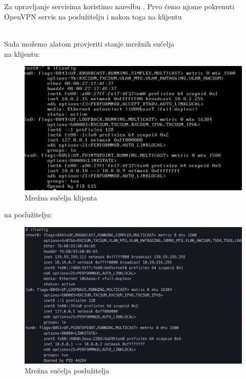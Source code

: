         \noindent
         \\
         \\
         \\
         \\

        Za upravljanje servisima koristimo naredbu . Prvo ćemo
        njome pokrenuti OpenVPN servis na poslužitelju i nakon toga na klijentu

        \noindent
         \\

        \noindent
        Sada možemo alatom  provjeriti stanje mrežnih sučelja \\
        na klijentu: \\
        \begin{figure}[H]
            \centering
            \includegraphics[scale=0.5]{slike/clientIfconfig}
            \caption{Mrežna sučelja klijenta }
        \end{figure}
        na poslužitelju: \\
        \begin{figure}[H]
            \centering
            \includegraphics[scale=0.5]{slike/serverIfconfig}
            \caption{Mrežna sučelja poslužitelja}
        \end{figure}

